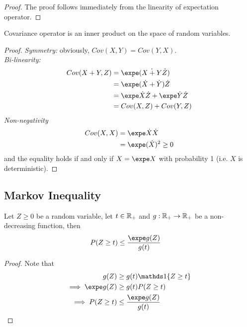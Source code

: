 \documentclass{article}
\begin{document}
   	\begin{proof}
   		The proof follows immediately from the linearity of expectation operator.
   	\end{proof}
   	
   	\begin{theorem}
   		Covariance operator is an inner product on the space of random variables.
   	\end{theorem}
   	
   	\begin{proof}
   		\emph{Symmetry:} obviously, $Cov(X, Y) = Cov(Y, X)$. \\
   		\emph{Bi-linearity:}
   		\begin{align}
   			Cov(X+Y, Z) &= \expe (\dot{X + Y} \dot{Z}) \\
   			&= \expe (\dot{X} + \dot{Y}) \dot{Z} \\
   			&= \expe \dot{X}\dot{Z} + \expe \dot{Y} \dot{Z} \\
   			&= Cov(X, Z) + Cov(Y, Z)
   		\end{align}
   		\emph{Non-negativity}
   		\begin{align}
   			Cov(X, X) &= \expe \dot{X} \dot{X} \\
   			&= \expe (\dot{X})^2 \geq 0
   		\end{align}
   		and the equality holds if and only if $X = \expe X$ with probability 1 (i.e. $X$ is deterministic).
   	\end{proof}
   	
   	\subsection{Markov Inequality}
   	\begin{theorem}
   		Let $Z \geq 0$ be a random variable, let $t \in \mathbb{R}_+$ and $g: \mathbb{R}_+ \to \mathbb{R}_+$ be a non-decreasing function, then
   		\begin{align}
   			P(Z \geq t) &\leq \frac{\expe g(Z)}{g(t)}
   		\end{align}
   	\end{theorem}
   	
   	\begin{proof} Note that
   		\begin{align}
   			g(Z) &\geq g(t) \id{Z \geq t} \\
   			\implies \expe g(Z) &\geq g(t) P(Z \geq t) \\
   			\implies P(Z \geq t) &\leq \frac{\expe g(Z)}{g(t)}
   		\end{align}
   	\end{proof}
   	
\end{document}
